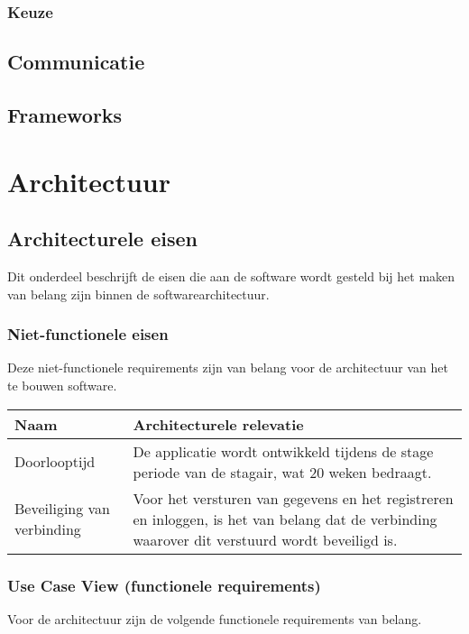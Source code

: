 \documentclass[a4paper,11pt,oneside]{report}
\begin{document}
\subsection{Keuze}

\section{Communicatie}

\section{Frameworks}

\chapter{Architectuur}

\section{Architecturele eisen}
Dit onderdeel beschrijft de eisen die aan de software wordt gesteld bij het
maken van belang zijn binnen de softwarearchitectuur.
\subsection{Niet-functionele eisen}
Deze niet-functionele requirements zijn van belang voor de architectuur van het te bouwen
software.

\begin{table}[h]
\begin{tabular}{| l | p{10cm} |}
\hline
\rowcolor{lightgray}
Naam                       & Architecturele relevatie \\
\hline
Doorlooptijd               & De applicatie wordt ontwikkeld tijdens de stage
                             periode van de stagair, wat 20 weken bedraagt. \\
                             \hline
Beveiliging van verbinding & Voor het versturen van gegevens en het registreren
                             en inloggen, is het van belang dat de verbinding
                             waarover dit verstuurd wordt beveiligd is. \\
                             \hline
\end{tabular}
\end{table}

\subsection{Use Case View (functionele requirements)}
Voor de architectuur zijn de volgende functionele requirements van belang.
\end{document}
